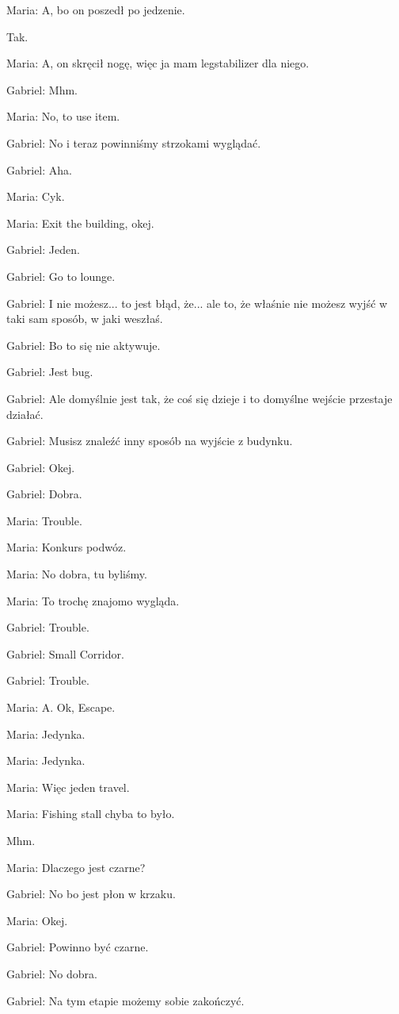 Maria: A, bo on poszedł po jedzenie.

Tak.

Maria: A, on skręcił nogę, więc ja mam legstabilizer dla niego.

Gabriel: Mhm.

Maria: No, to use item.

Gabriel: No i teraz powinniśmy strzokami wyglądać.

Gabriel: Aha.

Maria: Cyk.

Maria: Exit the building, okej.

Gabriel: Jeden.

Gabriel: Go to lounge.

Gabriel: I nie możesz... to jest błąd, że... ale to, że właśnie nie możesz wyjść w taki sam sposób, w jaki weszłaś.

Gabriel: Bo to się nie aktywuje.

Gabriel: Jest bug.

Gabriel: Ale domyślnie jest tak, że coś się dzieje i to domyślne wejście przestaje działać.

Gabriel: Musisz znaleźć inny sposób na wyjście z budynku.

Gabriel: Okej.

Gabriel: Dobra.

Maria: Trouble.

Maria: Konkurs podwóz.

Maria: No dobra, tu byliśmy.

Maria: To trochę znajomo wygląda.

Gabriel: Trouble.

Gabriel: Small Corridor.

Gabriel: Trouble.

Maria: A. Ok, Escape.

Maria: Jedynka.

Maria: Jedynka.

Maria: Więc jeden travel.

Maria: Fishing stall chyba to było.

Mhm.

Maria: Dlaczego jest czarne?

Gabriel: No bo jest płon w krzaku.

Maria: Okej.

Gabriel: Powinno być czarne.

Gabriel: No dobra.

Gabriel: Na tym etapie możemy sobie zakończyć.

